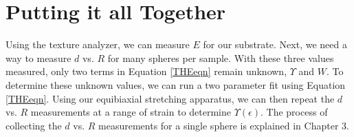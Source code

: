 \section{Putting it all Together}
Using the texture analyzer, we can measure $ E $ for our substrate. Next, we need a way to measure $ d $ vs. $ R $ for many spheres per sample. With these three values measured, only two terms in Equation \ref{THEeqn} remain unknown, $ \Upsilon $ and $ W $. To determine these unknown values, we can run a two parameter fit using Equation \ref{THEeqn}. Using our equibiaxial stretching apparatus, we can then repeat the $ d $ vs. $ R $ measurements at a range of strain to determine $ \Upsilon(\epsilon) $. The process of collecting the $ d $ vs. $ R $ measurements for a single sphere is explained in Chapter 3.

%